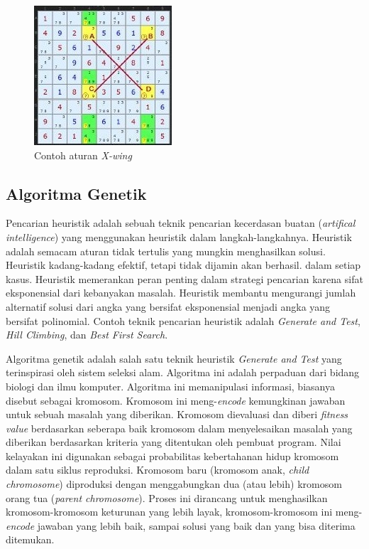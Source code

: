 \begin{figure}
\centering
\captionsetup{justification=centering}
\includegraphics[scale=1]{Gambar/HybridGenetic6}
\caption[Contoh aturan \textit{X-wing} ~\cite{johanna:12:hybrid}]{Contoh aturan \textit{X-wing} ~\cite{johanna:12:hybrid}}
\label{fig:hybrid6}
\end{figure}

\subsection{Algoritma Genetik}
\label{sec:genetik}

Pencarian heuristik adalah sebuah teknik pencarian kecerdasan buatan (\textit{artifical intelligence}) yang menggunakan heuristik dalam langkah-langkahnya. Heuristik adalah semacam aturan tidak tertulis yang mungkin menghasilkan solusi. Heuristik kadang-kadang efektif, tetapi tidak dijamin akan berhasil. dalam setiap kasus. Heuristik memerankan peran penting dalam strategi pencarian karena sifat eksponensial dari kebanyakan masalah. Heuristik membantu mengurangi jumlah alternatif solusi dari angka yang bersifat eksponensial menjadi angka yang bersifat polinomial. Contoh teknik pencarian heuristik adalah \textit{Generate and Test}, \textit{Hill Climbing}, dan \textit{Best First Search}.

Algoritma genetik adalah salah satu teknik heuristik \textit{Generate and Test} yang terinspirasi oleh sistem seleksi alam. Algoritma ini adalah perpaduan dari bidang biologi dan ilmu komputer. Algoritma ini memanipulasi informasi, biasanya disebut sebagai kromosom. Kromosom ini meng-\textit{encode} kemungkinan jawaban untuk sebuah masalah yang diberikan. Kromosom dievaluasi dan diberi \textit{fitness value} berdasarkan seberapa baik kromosom dalam menyelesaikan masalah yang diberikan berdasarkan kriteria yang ditentukan oleh pembuat program. Nilai kelayakan ini digunakan sebagai probabilitas kebertahanan hidup kromosom dalam satu siklus reproduksi. Kromosom baru (kromosom anak, \textit{child chromosome}) diproduksi dengan menggabungkan dua (atau lebih) kromosom orang tua (\textit{parent chromosome}). Proses ini dirancang untuk menghasilkan kromosom-kromosom keturunan yang lebih layak, kromosom-kromosom ini meng-\textit{encode} jawaban yang lebih baik, sampai solusi yang baik dan yang bisa diterima ditemukan.

